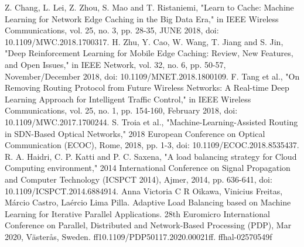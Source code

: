 \documentclass[conference]{IEEEtran}
\begin{document}

%
%
%
\begin{thebibliography}{1}

Z. Chang, L. Lei, Z. Zhou, S. Mao and T. Ristaniemi, "Learn to Cache: Machine Learning for Network Edge Caching in the Big Data Era," in IEEE Wireless Communications, vol. 25, no. 3, pp. 28-35, JUNE 2018, doi: 10.1109/MWC.2018.1700317.
H. Zhu, Y. Cao, W. Wang, T. Jiang and S. Jin, "Deep Reinforcement Learning for Mobile Edge Caching: Review, New Features, and Open Issues," in IEEE Network, vol. 32, no. 6, pp. 50-57, November/December 2018, doi: 10.1109/MNET.2018.1800109.
F. Tang et al., "On Removing Routing Protocol from Future Wireless Networks: A Real-time Deep Learning Approach for Intelligent Traffic Control," in IEEE Wireless Communications, vol. 25, no. 1, pp. 154-160, February 2018, doi: 10.1109/MWC.2017.1700244.
S. Troia et al., "Machine-Learning-Assisted Routing in SDN-Based Optical Networks," 2018 European Conference on Optical Communication (ECOC), Rome, 2018, pp. 1-3, doi: 10.1109/ECOC.2018.8535437.
R. A. Haidri, C. P. Katti and P. C. Saxena, "A load balancing strategy for Cloud Computing environment," 2014 International Conference on Signal Propagation and Computer Technology (ICSPCT 2014), Ajmer, 2014, pp. 636-641, doi: 10.1109/ICSPCT.2014.6884914.
Anna Victoria C R Oikawa, Vinicius Freitas, Márcio Castro, Laércio Lima Pilla. Adaptive Load
Balancing based on Machine Learning for Iterative Parallel Applications. 28th Euromicro International Conference on Parallel, Distributed and Network-Based Processing (PDP), Mar 2020, Västerås,
Sweden. ff10.1109/PDP50117.2020.00021ff. ffhal-02570549f

\end{thebibliography}
\end{document}

